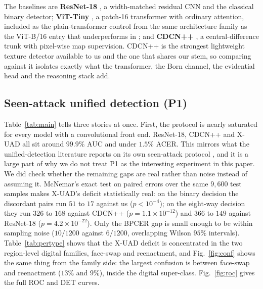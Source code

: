 \documentclass[conference]{IEEEtran}
\begin{document}
The baselines are \textbf{ResNet-18} \cite{he2016resnet}, a width-matched residual
CNN and the classical binary detector; \textbf{ViT-Tiny} \cite{dosovitskiy2021vit},
a patch-16 transformer with ordinary attention, included as the plain-transformer
control from the same architecture family as the ViT-B/16 entry that underperforms
in \cite{yu2024unified}; and \textbf{CDCN++} \cite{yu2020cdcn,yu2021revisiting}, a
central-difference trunk with pixel-wise map supervision. CDCN++ is the strongest
lightweight texture detector available to us and the one that shares our stem, so
comparing against it isolates exactly what the transformer, the Born channel, the
evidential head and the reasoning stack add.

\subsection{Seen-attack unified detection (P1)}

\begin{table}[t]
\centering
\caption{Protocol P1 (seen attacks, identity-disjoint, ID-consistent). ACC$_8$ is
eight-way family accuracy; all other metrics follow ISO/IEC 30107-3
\cite{iso30107}. Best per column in bold. ViT-Tiny's low ECE is an artifact of a
detector operating near chance; among the three working detectors, X-UAD is best
calibrated.}
\label{tab:main}
\footnotesize

\end{table}

Table~\ref{tab:main} tells three stories at once. First, the protocol is nearly
saturated for every model with a convolutional front end. ResNet-18, CDCN++ and
X-UAD all sit around $99.9\%$ AUC and under $1.5\%$ ACER. This mirrors what the
unified-detection literature reports on its own seen-attack protocol
\cite{yu2024unified}, and it is a large part of why we do not treat P1 as the
interesting experiment in this paper. We did check whether the remaining gaps are
real rather than noise instead of assuming it. McNemar's exact test on paired errors
over the same $9{,}600$ test samples makes X-UAD's deficit statistically real: on the
binary decision the discordant pairs run $51$ to $17$ against us ($p<10^{-4}$); on the
eight-way decision they run $326$ to $168$ against CDCN++ ($p=1.1\times10^{-12}$) and
$366$ to $149$ against ResNet-18 ($p=4.2\times10^{-22}$). Only the BPCER gap is small
enough to be within sampling noise ($10/1200$ against $6/1200$, overlapping Wilson
$95\%$ intervals). Table~\ref{tab:pertype} shows that the X-UAD deficit is
concentrated in the two region-level digital families, face-swap and reenactment,
and Fig.~\ref{fig:conf} shows the same thing from the family side: the largest
confusion is between face-swap and reenactment ($13\%$ and $9\%$), inside the
digital super-class. Fig.~\ref{fig:roc} gives the full ROC and DET curves.
\end{document}

